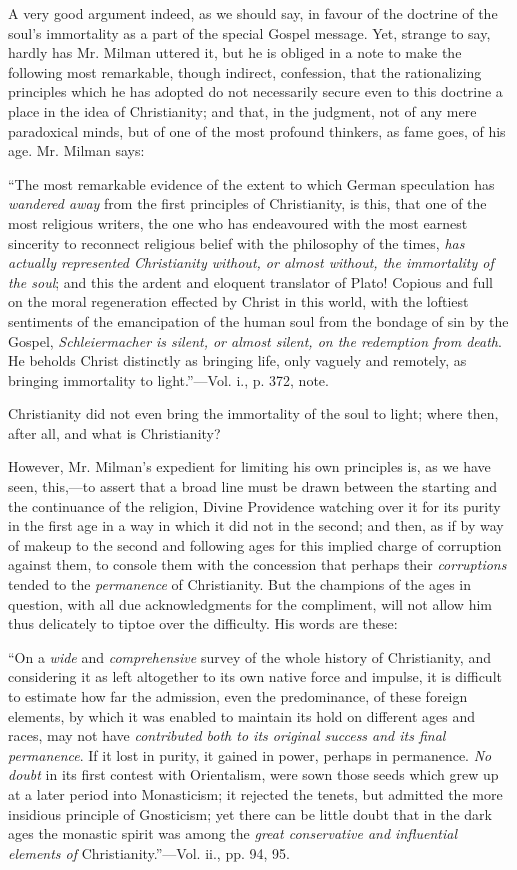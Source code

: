 A very good argument indeed, as we should say, in
favour of the doctrine of the soul's immortality as a part of the
special Gospel message. Yet, strange to say, hardly has Mr. Milman
uttered it, but he is obliged in a note to make the following most
remarkable, though indirect, confession, that the rationalizing
principles which he has adopted do not necessarily secure even to this
doctrine a place in the idea of Christianity; and that, in the
judgment, not of any mere paradoxical minds, but of one of the most
profound thinkers, as fame goes, of his age. Mr. Milman says:

``The
most remarkable evidence of the extent to which German speculation has
\emph{wandered away} from the first principles of Christianity, is
this, that one of the most religious writers, the one who has
endeavoured with the most earnest sincerity to reconnect religious
belief with the philosophy of the times, \emph{has actually represented
Christianity without, or almost without, the immortality of the soul};
and this the ardent and eloquent translator of Plato! Copious and full
on the moral regeneration effected by Christ in this world, with the
loftiest sentiments of the emancipation of the human soul from the
bondage of sin by the Gospel, \emph{Schleiermacher is silent, or almost
silent, on the redemption from death}. He beholds Christ distinctly
as bringing life, only vaguely and remotely, as bringing immortality
to light.''—Vol. i., p. 372, note.

Christianity did not even bring the immortality
of the soul to light; where then, after all, and what is
Christianity?

However, Mr. Milman's expedient for limiting his
own principles is, as we have seen, this,—to assert that a broad
line must be drawn between the starting and the continuance of the
religion, Divine Providence watching over it for its purity in the
first age in a way in which it did not in the second; and then, as if
by way of makeup to the second and following ages for this implied
charge of corruption against them, to console them with the concession
that perhaps their \emph{corruptions} tended to the \emph{permanence}
of Christianity. But the champions of the ages in question, with all
due acknowledgments for the compliment, will not allow him thus
delicately to tiptoe over the difficulty. His words are these:

``On
a \emph{wide} and \emph{comprehensive} survey of the whole history of
Christianity, and considering it as left altogether to its own native
force and impulse, it is difficult to estimate how far the admission,
even the predominance, of these foreign elements, by which it was
enabled to maintain its hold on different ages and races, may not have
\emph{contributed both to its original success and its final permanence}.
If it lost in purity, it gained in power, perhaps in permanence. \emph{No
doubt} in its first contest with Orientalism, were sown those seeds
which grew up at a later period into Monasticism; it rejected the
tenets, but admitted the more insidious principle of Gnosticism; yet
there can be little doubt that in the dark ages the monastic spirit
was among the \emph{great conservative and influential elements of}
Christianity.''—Vol. ii., pp. 94, 95.

